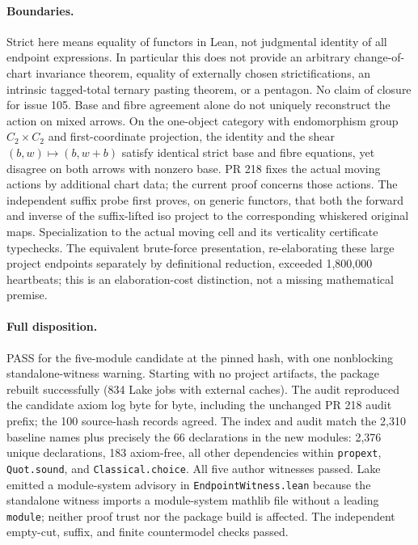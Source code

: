 \paragraph{Boundaries.}
Strict here means equality of functors in Lean, not judgmental identity of all endpoint expressions. In particular this does not provide an arbitrary change-of-chart invariance theorem, equality of externally chosen strictifications, an intrinsic tagged-total ternary pasting theorem, or a pentagon. No claim of closure for issue 105.
Base and fibre agreement alone do not uniquely reconstruct the action on mixed arrows. On the one-object category with endomorphism group $C_2\times C_2$ and first-coordinate projection, the identity and the shear $(b,w)\mapsto(b,w+b)$ satisfy identical strict base and fibre equations, yet disagree on both arrows with nonzero base. PR 218 fixes the actual moving actions by additional chart data; the current proof concerns those actions.
The independent suffix probe first proves, on generic functors, that both the forward and inverse of the suffix-lifted iso project to the corresponding whiskered original maps. Specialization to the actual moving cell and its verticality certificate typechecks. The equivalent brute-force presentation, re-elaborating these large project endpoints separately by definitional reduction, exceeded 1,800,000 heartbeats; this is an elaboration-cost distinction, not a missing mathematical premise.
\paragraph{Full disposition.} PASS for the five-module candidate at the pinned hash, with one nonblocking standalone-witness warning. Starting with no project artifacts, the package rebuilt successfully (834 Lake jobs with external caches). The audit reproduced the candidate axiom log byte for byte, including the unchanged PR 218 audit prefix; the 100 source-hash records agreed. The index and audit match the 2,310 baseline names plus precisely the 66 declarations in the new modules: 2,376 unique declarations, 183 axiom-free, all other dependencies within \texttt{propext}, \texttt{Quot.sound}, and \texttt{Classical.choice}. All five author witnesses passed. Lake emitted a module-system advisory in \texttt{EndpointWitness.lean} because the standalone witness imports a module-system mathlib file without a leading \texttt{module}; neither proof trust nor the package build is affected. The independent empty-cut, suffix, and finite countermodel checks passed.
